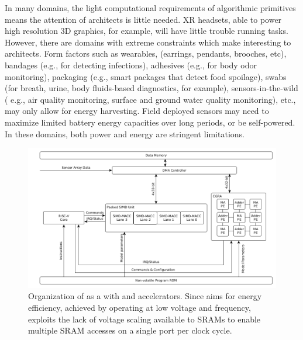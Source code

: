 In many
domains, the light computational requirements of \olfc{} algorithmic primitives
means the attention of architects is little needed. XR headsets, able to power
high resolution 3D graphics, for example, will have little trouble running
\olfc{} tasks.  However, there are domains with
extreme constraints which make \olfc{} interesting to architects.
Form factors such as wearables, (earrings, pendants, brooches, etc), bandages
(e.g., for detecting infections), adhesives (e.g., for body odor monitoring),
packaging (e.g., smart packages that detect food spoilage), swabs (for breath,
urine, body fluids-based diagnostics, for example), sensors-in-the-wild ( e.g.,
air quality monitoring, surface and ground water quality monitoring), etc., may
only allow for energy harvesting.  Field deployed sensors may need to maximize
limited battery energy capacities over long periods, or be self-powered.  In
these domains, both power and energy are stringent limitations.

 

\begin{figure}
\centering
    \includegraphics[width=\linewidth]{./figs/odor_arch.png}
    \caption{\small
            Organization of \arch{} as a \mcu{} with \vmacc{} and \cgra{}
            accelerators. Since \arch{} aims for energy efficiency, achieved by
            operating at low voltage and frequency, \arch{} exploits the lack
            of voltage scaling available to SRAMs to enable multiple SRAM
            accesses on a single port per clock cycle.
        }
    \label{fig:arch}
\end{figure}

